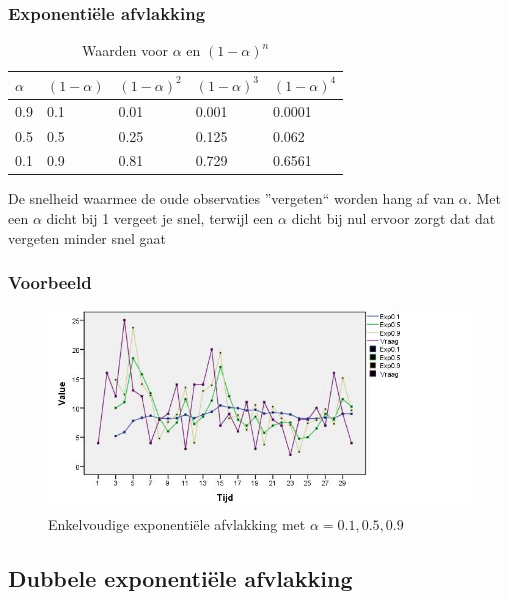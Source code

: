 \documentclass{beamer}
\begin{document}
\begin{frame}
  \frametitle{Exponentiële afvlakking}

  \begin{table}
    \centering
    \begin{tabular}{l|llll}
      $\alpha$ & $(1-\alpha)$ & $(1-\alpha)^{2}$ & $(1-\alpha)^{3}$ & $(1-\alpha)^{4}$ \\ \hline
      0.9   & 0.1       & 0.01             & 0.001                      & 0.0001           \\
      0.5   & 0.5       & 0.25             & 0.125                      & 0.062            \\
      0.1   & 0.9       & 0.81             & 0.729                      & 0.6561           \\
    \end{tabular}
    \caption{Waarden voor $\alpha$ en $(1-\alpha)^{n}$}
    \label{tab:alpha}
  \end{table}
  De snelheid waarmee de oude observaties ''vergeten`` worden hang af van $\alpha$. Met een $\alpha$ dicht bij 1 vergeet je snel, terwijl een $\alpha$ dicht bij nul ervoor zorgt dat dat vergeten minder snel gaat
\end{frame}


\begin{frame}
  \frametitle{Voorbeeld}
  \begin{figure}[htbp]
    \centering
    \includegraphics[width=\textwidth]{img/tijdreeks51}
    \caption{Enkelvoudige exponentiële afvlakking met $\alpha=0.1 , 0.5, 0.9$}
    \label{fig:tijdreeks51}
  \end{figure}
\end{frame}

\subsection{Dubbele exponenti\"ele afvlakking}
\end{document}
